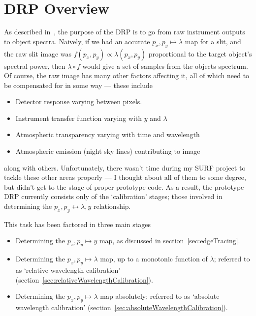 \section{DRP Overview}

As described in~\cite{surfreport}, the purpose of the DRP is to go
from raw instrument outputs to object spectra. Naively, if we had an
accurate $p_x, p_y \mapsto \lambda$ map for a slit, and the raw slit
image was $f(p_x, p_y) \propto \lambda(p_x, p_y)$ proportional to the target
object's spectral power, then $\lambda \circ f$ would give a set of
samples from the objects spectrum. Of course, the raw image has many
other factors affecting it, all of which need to be compensated for in
some way --- these include
%
\begin{itemize}
\item Detector response varying between pixels.
\item Instrument transfer function varying with $y$ and $\lambda$
\item Atmospheric transparency varying with time and wavelength
\item Atmospheric emission (night sky lines) contributing to image
\end{itemize}
%
along with others. Unfortunately, there wasn't time during my SURF project
to tackle these other areas properly --- I thought about all of them to some degree,
but didn't get to the stage of proper prototype code. As a result, the prototype
DRP currently consists only of the `calibration' stages; those involved in
determining the $p_x, p_y \leftrightarrow \lambda, y$ relationship.

This task has been factored in three main stages
\begin{itemize}
\item Determining the $p_x, p_y \mapsto y$ map, as discussed in
section~\ref{sec:edgeTracing}.
\item Determining the $p_x, p_y \mapsto \lambda$ map, up to a monotonic
function of $\lambda$; referred to as `relative wavelength calibration'
(section~\ref{sec:relativeWavelengthCalibration}).
\item Determining the $p_x, p_y \mapsto \lambda$ map absolutely;
referred to as `absolute wavelength calibration' (section~\ref{sec:absoluteWavelengthCalibration}).
\end{itemize}
